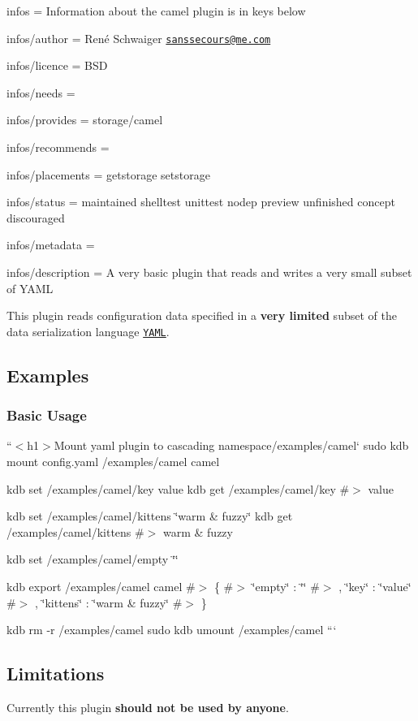 
\begin{DoxyItemize}
\item infos = Information about the camel plugin is in keys below
\item infos/author = René Schwaiger \href{mailto:sanssecours@me.com}{\tt sanssecours@me.\+com}
\item infos/licence = B\+SD
\item infos/needs =
\item infos/provides = storage/camel
\item infos/recommends =
\item infos/placements = getstorage setstorage
\item infos/status = maintained shelltest unittest nodep preview unfinished concept discouraged
\item infos/metadata =
\item infos/description = A very basic plugin that reads and writes a very small subset of Y\+A\+ML
\end{DoxyItemize}

This plugin reads configuration data specified in a {\bfseries very limited} subset of the data serialization language \href{http://www.yaml.org}{\tt Y\+A\+ML}.

\subsection*{Examples}

\subsubsection*{Basic Usage}

``{\ttfamily  $<$h1$>$Mount yaml plugin to cascading namespace}/examples/camel` sudo kdb mount config.\+yaml /examples/camel camel

kdb set /examples/camel/key value kdb get /examples/camel/key \#$>$ value

kdb set /examples/camel/kittens \char`\"{}warm \& fuzzy\char`\"{} kdb get /examples/camel/kittens \#$>$ warm \& fuzzy

kdb set /examples/camel/empty \char`\"{}\char`\"{}

kdb export /examples/camel camel \#$>$ \{ \#$>$ \char`\"{}empty\char`\"{} \+: \char`\"{}\char`\"{} \#$>$ , \char`\"{}key\char`\"{} \+: \char`\"{}value\char`\"{} \#$>$ , \char`\"{}kittens\char`\"{} \+: \char`\"{}warm \& fuzzy\char`\"{} \#$>$ \}

kdb rm -\/r /examples/camel sudo kdb umount /examples/camel ```

\subsection*{Limitations}

Currently this plugin {\bfseries should not be used by anyone}. 
